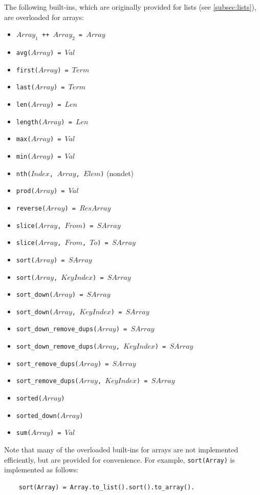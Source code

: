 The following built-ins, which are originally provided for lists (see \ref{subsec:lists}), are overloaded for arrays:
\begin{itemize}
\item \texttt{$Array_1$ ++ $Array_2$ = $Array$}
\item \texttt{avg($Array$) = $Val$}
\item \texttt{first($Array$) = $Term$}
\item \texttt{last($Array$) = $Term$}
\item \texttt{len($Array$) = $Len$}
\item \texttt{length($Array$) = $Len$}
\item \texttt{max($Array$) = $Val$}
\item \texttt{min($Array$) = $Val$}
\item \texttt{nth($Index$, $Array$, $Elem$)} (nondet)
\item \texttt{prod($Array$) = $Val$}
\item \texttt{reverse($Array$) = $ResArray$}
\item \texttt{slice($Array$, $From$) = $SArray$}
\item \texttt{slice($Array$, $From$, $To$) = $SArray$}
\item \texttt{sort($Array$) = $SArray$}
\item \texttt{sort($Array$, $KeyIndex$) = $SArray$}
\item \texttt{sort\_down($Array$) = $SArray$}
\item \texttt{sort\_down($Array$, $KeyIndex$) = $SArray$}
\item \texttt{sort\_down\_remove\_dups($Array$) = $SArray$}
\item \texttt{sort\_down\_remove\_dups($Array$, $KeyIndex$) = $SArray$}
\item \texttt{sort\_remove\_dups($Array$) = $SArray$}
\item \texttt{sort\_remove\_dups($Array$, $KeyIndex$) = $SArray$}
\item \texttt{sorted($Array$)}
\item \texttt{sorted\_down($Array$)}
\item \texttt{sum($Array$) = $Val$}
\end{itemize}
Note that many of the overloaded built-ins for arrays are not implemented efficiently, but are provided for convenience. For example, \texttt{sort(Array)} is implemented as follows:
\begin{verbatim}
    sort(Array) = Array.to_list().sort().to_array().
\end{verbatim}

